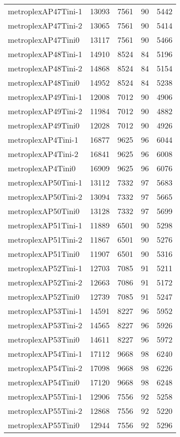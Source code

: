 \begin{longtable}{lrrrr}
metroplexAP47Tini-1 & 13093 & 7561 & 90 & 5442 \\
metroplexAP47Tini-2 & 13065 & 7561 & 90 & 5414 \\
metroplexAP47Tini0 & 13117 & 7561 & 90 & 5466 \\
metroplexAP48Tini-1 & 14910 & 8524 & 84 & 5196 \\
metroplexAP48Tini-2 & 14868 & 8524 & 84 & 5154 \\
metroplexAP48Tini0 & 14952 & 8524 & 84 & 5238 \\
metroplexAP49Tini-1 & 12008 & 7012 & 90 & 4906 \\
metroplexAP49Tini-2 & 11984 & 7012 & 90 & 4882 \\
metroplexAP49Tini0 & 12028 & 7012 & 90 & 4926 \\
metroplexAP4Tini-1 & 16877 & 9625 & 96 & 6044 \\
metroplexAP4Tini-2 & 16841 & 9625 & 96 & 6008 \\
metroplexAP4Tini0 & 16909 & 9625 & 96 & 6076 \\
metroplexAP50Tini-1 & 13112 & 7332 & 97 & 5683 \\
metroplexAP50Tini-2 & 13094 & 7332 & 97 & 5665 \\
metroplexAP50Tini0 & 13128 & 7332 & 97 & 5699 \\
metroplexAP51Tini-1 & 11889 & 6501 & 90 & 5298 \\
metroplexAP51Tini-2 & 11867 & 6501 & 90 & 5276 \\
metroplexAP51Tini0 & 11907 & 6501 & 90 & 5316 \\
metroplexAP52Tini-1 & 12703 & 7085 & 91 & 5211 \\
metroplexAP52Tini-2 & 12663 & 7086 & 91 & 5172 \\
metroplexAP52Tini0 & 12739 & 7085 & 91 & 5247 \\
metroplexAP53Tini-1 & 14591 & 8227 & 96 & 5952 \\
metroplexAP53Tini-2 & 14565 & 8227 & 96 & 5926 \\
metroplexAP53Tini0 & 14611 & 8227 & 96 & 5972 \\
metroplexAP54Tini-1 & 17112 & 9668 & 98 & 6240 \\
metroplexAP54Tini-2 & 17098 & 9668 & 98 & 6226 \\
metroplexAP54Tini0 & 17120 & 9668 & 98 & 6248 \\
metroplexAP55Tini-1 & 12906 & 7556 & 92 & 5258 \\
metroplexAP55Tini-2 & 12868 & 7556 & 92 & 5220 \\
metroplexAP55Tini0 & 12944 & 7556 & 92 & 5296 \\

\end{longtable}
